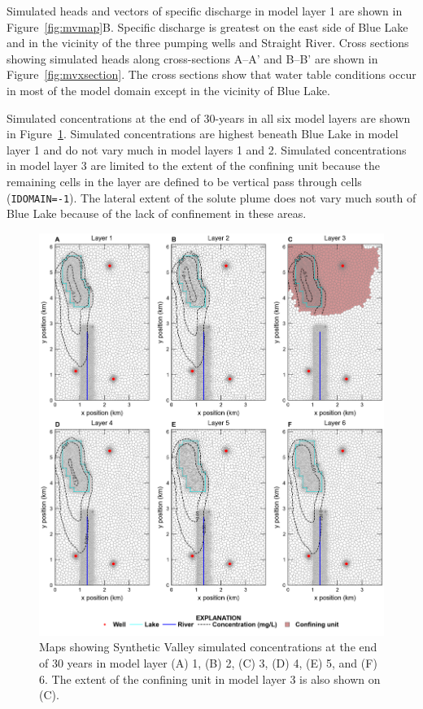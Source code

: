\documentclass[12pt, oneside]{article}  	%
\begin{document}
Simulated heads and vectors of specific discharge in model layer 1 are shown in Figure~\ref{fig:mvmap}B. Specific discharge is greatest on the east side of Blue Lake and in the vicinity of the three pumping wells and Straight River. Cross sections showing simulated heads along cross-sections A--A' and B--B' are shown in Figure~\ref{fig:mvxsection}. The cross sections show that water table conditions occur in most of the model domain except in the vicinity of Blue Lake.

Simulated concentrations at the end of 30-years in all six model layers are shown in Figure~\ref{fig:mvconc}. Simulated concentrations are highest beneath Blue Lake in model layer 1 and do not vary much in model layers 1 and 2. Simulated concentrations in model layer 3 are limited to the extent of the confining unit because the remaining cells in the layer are defined to be vertical pass through cells (\texttt{IDOMAIN=-1}). The lateral extent of the solute plume does not vary much south of Blue Lake because of the lack of confinement in these areas.

\begin{figure}[ht!]
	\begin{center}
		\includegraphics{figures/mv_voronoi_map_concentration.png}
	\end{center}
	\caption{Maps showing Synthetic Valley simulated concentrations at the end of 30 years in model layer (A) 1, (B) 2, (C) 3, (D) 4, (E) 5, and (F) 6. The extent of the confining unit in model layer 3 is also shown on (C).}
	\label{fig:mvconc}
\end{figure}
\end{document}
